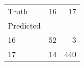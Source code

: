 \begin{tabular}{lrr}
\toprule
Truth & 16 & 17 \\
Predicted &  &  \\
\midrule
16 & 52 & 3 \\
17 & 14 & 440 \\
\bottomrule
\end{tabular}
